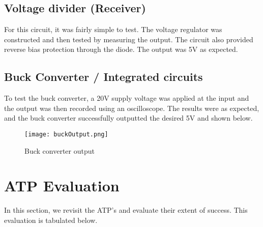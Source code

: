 \documentclass[class=report,11pt,crop=false]{standalone}
\begin{document}
\subsection{Voltage divider (Receiver)}

For this circuit, it was fairly simple to test. The voltage regulator was constructed and then tested by measuring the output. The circuit also provided reverse bias protection through the diode. The output was 5V as expected.

\subsection{Buck Converter / Integrated circuits}

To test the buck converter, a 20V supply voltage was applied at the input and the output was then recorded using an oscilloscope. The results were as expected, and the buck converter successfully outputted the desired 5V and shown below.
\begin{figure}
    \centering
    \texttt{[image: buckOutput.png]}
    \caption{Buck converter output}
    \label{fig:enter-label}
\end{figure}

\section{ATP Evaluation}

In this section, we revisit the ATP’s and evaluate their extent of success. This evaluation is tabulated below.
\end{document}

